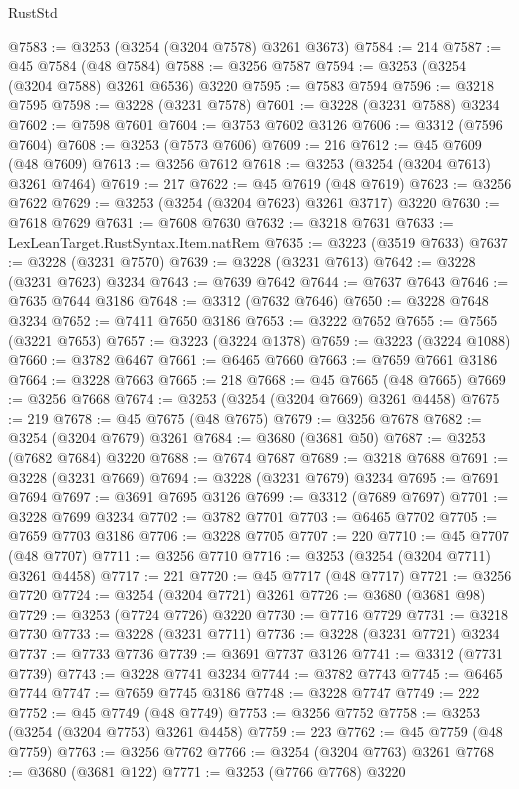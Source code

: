 \begin{lexlean}{RustStd}
\begin{coremodule}
@7583 := @3253 (@3254 (@3204 @7578) @3261 @3673)
@7584 := 214
@7587 := @45 @7584 (@48 @7584)
@7588 := @3256 @7587
@7594 := @3253 (@3254 (@3204 @7588) @3261 @6536) @3220
@7595 := @7583 @7594
@7596 := @3218 @7595
@7598 := @3228 (@3231 @7578)
@7601 := @3228 (@3231 @7588) @3234
@7602 := @7598 @7601
@7604 := @3753 @7602 @3126
@7606 := @3312 (@7596 @7604)
@7608 := @3253 (@7573 @7606)
@7609 := 216
@7612 := @45 @7609 (@48 @7609)
@7613 := @3256 @7612
@7618 := @3253 (@3254 (@3204 @7613) @3261 @7464)
@7619 := 217
@7622 := @45 @7619 (@48 @7619)
@7623 := @3256 @7622
@7629 := @3253 (@3254 (@3204 @7623) @3261 @3717) @3220
@7630 := @7618 @7629
@7631 := @7608 @7630
@7632 := @3218 @7631
@7633 := LexLeanTarget.RustSyntax.Item.natRem
@7635 := @3223 (@3519 @7633)
@7637 := @3228 (@3231 @7570)
@7639 := @3228 (@3231 @7613)
@7642 := @3228 (@3231 @7623) @3234
@7643 := @7639 @7642
@7644 := @7637 @7643
@7646 := @7635 @7644 @3186
@7648 := @3312 (@7632 @7646)
@7650 := @3228 @7648 @3234
@7652 := @7411 @7650 @3186
@7653 := @3222 @7652
@7655 := @7565 (@3221 @7653)
@7657 := @3223 (@3224 @1378)
@7659 := @3223 (@3224 @1088)
@7660 := @3782 @6467
@7661 := @6465 @7660
@7663 := @7659 @7661 @3186
@7664 := @3228 @7663
@7665 := 218
@7668 := @45 @7665 (@48 @7665)
@7669 := @3256 @7668
@7674 := @3253 (@3254 (@3204 @7669) @3261 @4458)
@7675 := 219
@7678 := @45 @7675 (@48 @7675)
@7679 := @3256 @7678
@7682 := @3254 (@3204 @7679) @3261
@7684 := @3680 (@3681 @50)
@7687 := @3253 (@7682 @7684) @3220
@7688 := @7674 @7687
@7689 := @3218 @7688
@7691 := @3228 (@3231 @7669)
@7694 := @3228 (@3231 @7679) @3234
@7695 := @7691 @7694
@7697 := @3691 @7695 @3126
@7699 := @3312 (@7689 @7697)
@7701 := @3228 @7699 @3234
@7702 := @3782 @7701
@7703 := @6465 @7702
@7705 := @7659 @7703 @3186
@7706 := @3228 @7705
@7707 := 220
@7710 := @45 @7707 (@48 @7707)
@7711 := @3256 @7710
@7716 := @3253 (@3254 (@3204 @7711) @3261 @4458)
@7717 := 221
@7720 := @45 @7717 (@48 @7717)
@7721 := @3256 @7720
@7724 := @3254 (@3204 @7721) @3261
@7726 := @3680 (@3681 @98)
@7729 := @3253 (@7724 @7726) @3220
@7730 := @7716 @7729
@7731 := @3218 @7730
@7733 := @3228 (@3231 @7711)
@7736 := @3228 (@3231 @7721) @3234
@7737 := @7733 @7736
@7739 := @3691 @7737 @3126
@7741 := @3312 (@7731 @7739)
@7743 := @3228 @7741 @3234
@7744 := @3782 @7743
@7745 := @6465 @7744
@7747 := @7659 @7745 @3186
@7748 := @3228 @7747
@7749 := 222
@7752 := @45 @7749 (@48 @7749)
@7753 := @3256 @7752
@7758 := @3253 (@3254 (@3204 @7753) @3261 @4458)
@7759 := 223
@7762 := @45 @7759 (@48 @7759)
@7763 := @3256 @7762
@7766 := @3254 (@3204 @7763) @3261
@7768 := @3680 (@3681 @122)
@7771 := @3253 (@7766 @7768) @3220

\end{coremodule}
\end{lexlean}
